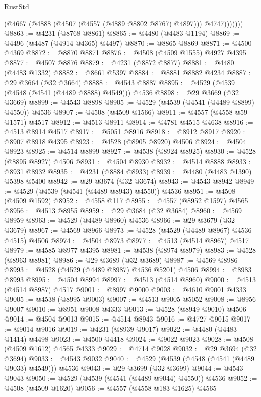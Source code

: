 \begin{lexlean}{RustStd}
\begin{coremodule}
                (@4667 (@4888 (@4507 (@4557 (@4889 @8802 @8767) @4897))) @4747)))))))
@8863 := @4231 (@8768 @8861)
@8865 := @4480 (@4483 @1194)
@8869 := @4496 (@4487 (@4914 @4365) @4497)
@8870 := @8865 @8869
@8871 := @4500 @4369
@8872 := @8870 @8871
@8876 := @4508 (@4509 @1555) @4927 @4395
@8877 := @4507 @8876
@8879 := @4231 (@8872 @8877)
@8881 := @4480 (@4483 @1332)
@8882 := @8661 @5397
@8884 := @8881 @8882 @4234
@8887 := @29 @3664 (@32 @3664)
@8888 := @4543 @8887
@8895 := @4529 (@4539 (@4548 (@4541 (@4489 @8888) @4549))) @4536
@8898 := @29 @3669 (@32 @3669)
@8899 := @4543 @8898
@8905 := @4529 (@4539 (@4541 (@4489 @8899) @4550)) @4536
@8907 := @4508 (@4509 @1566)
@8911 := @4557 (@4558 @59 @1571) @4517
@8912 := @4513 @8911
@8914 := @4781 @4515 @4638
@8916 := @4513 @8914 @4517
@8917 := @5051 @8916
@8918 := @8912 @8917
@8920 := @8907 @8918 @4395
@8923 := @4528 (@8905 @8920) @4506
@8924 := @4504 @8923
@8925 := @4514 @8899
@8927 := @4538 (@8924 @8925)
@8930 := @4528 (@8895 @8927) @4506
@8931 := @4504 @8930
@8932 := @4514 @8888
@8933 := @8931 @8932
@8935 := @4231 (@8884 @8933)
@8939 := @4480 (@4483 @1390) @5398 @5400
@8942 := @29 @3674 (@32 @3674)
@8943 := @4543 @8942
@8949 := @4529 (@4539 (@4541 (@4489 @8943) @4550)) @4536
@8951 := @4508 (@4509 @1592)
@8952 := @4558 @117
@8955 := @4557 (@8952 @1597) @4565
@8956 := @4513 @8955
@8959 := @29 @3684 (@32 @3684)
@8960 := @4569 @8959
@8963 := @4529 (@4489 @8960) @4536
@8966 := @29 @3679 (@32 @3679)
@8967 := @4569 @8966
@8973 := @4528 (@4529 (@4489 @8967) @4536 @4515) @4506
@8974 := @4504 @8973
@8977 := @4513 (@4514 @8967) @4517
@8979 := @4585 @8977 @4395
@8981 := @4538 (@8974 @8979)
@8983 := @4528 (@8963 @8981)
@8986 := @29 @3689 (@32 @3689)
@8987 := @4569 @8986
@8993 := @4528 (@4529 (@4489 @8987) @4536 @5201) @4506
@8994 := @8983 @8993
@8995 := @4504 @8994
@8997 := @4513 (@4514 @8960)
@9000 := @4513 (@4514 @8987) @4517
@9001 := @8997 @9000
@9003 := @4610 @9001 @4333
@9005 := @4538 (@8995 @9003)
@9007 := @4513 @9005 @5052
@9008 := @8956 @9007
@9010 := @8951 @9008 @4333
@9013 := @4528 (@8949 @9010) @4506
@9014 := @4504 @9013
@9015 := @4514 @8943
@9016 := @4727 @9015
@9017 := @9014 @9016
@9019 := @4231 (@8939 @9017)
@9022 := @4480 (@4483 @1414) @4498
@9023 := @4500 @4418
@9024 := @9022 @9023
@9028 := @4508 (@4509 @1612) @4565 @4333
@9029 := @4714 @9028
@9032 := @29 @3694 (@32 @3694)
@9033 := @4543 @9032
@9040 := @4529 (@4539 (@4548 (@4541 (@4489 @9033) @4549))) @4536
@9043 := @29 @3699 (@32 @3699)
@9044 := @4543 @9043
@9050 := @4529 (@4539 (@4541 (@4489 @9044) @4550)) @4536
@9052 := @4508 (@4509 @1620)
@9056 := @4557 (@4558 @183 @1625) @4565

\end{coremodule}
\end{lexlean}
